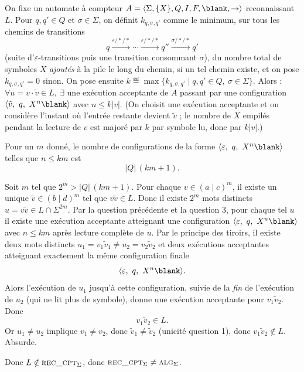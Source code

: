 \begin{corrections}
\begin{questions}
  \item On fixe un automate à compteur $A=\langle \Sigma,\{X\},Q,I,F,\blank,\rightarrow\rangle$ reconnaissant $L$.
    Pour $q,q'\in Q$ et $\sigma\in\Sigma$, on définit $k_{q,\sigma,q'}$ comme le minimum, sur tous les chemins de transitions
    \[
      q \xrightarrow{\varepsilon/\ast/\ast}\cdots\xrightarrow{\varepsilon/\ast/\ast} q'' \xrightarrow{\sigma/\ast/\ast} q'
    \]
    (suite d'$\varepsilon$-transitions puis une transition consommant $\sigma$), du nombre total de symboles $X$ \emph{ajoutés} à la pile le long du chemin,
    si un tel chemin existe, et on pose $k_{q,\sigma,q'}=0$ sinon.
    On pose ensuite
    $k \eqdef \max\{k_{q,\sigma,q'} \mid q,q'\in Q,\ \sigma\in\Sigma\}$.
    Alors :
    $\forall u=v\cdot \tilde v\in L,\ \exists$ une exécution acceptante de $A$ passant par une configuration
      $\langle \tilde v,\ q,\ X^n\blank\rangle$ avec $n\le k|v|$.
    (On choisit une exécution acceptante et on considère l'instant où l'entrée restante devient $\tilde v$ ; le nombre de $X$ empilés pendant la lecture de $v$
    est majoré par $k$ par symbole lu, donc par $k|v|$.)

  \item Pour un $m$ donné, le nombre de configurations de la forme $\langle \varepsilon,\ q,\ X^n\blank\rangle$ telles que $n\le km$ est
    \[
      |Q|\,(km+1).
    \]

  \item Soit $m$ tel que $2^m > |Q|\,(km+1)$.
    Pour chaque $v\in (a\mid c)^m$, il existe un unique $\tilde v\in (b\mid d)^m$ tel que $v\tilde v\in L$.
    Donc il existe $2^m$ mots distincts $u=v\tilde v\in L\cap \Sigma^{2m}$.
    Par la question précédente et la question 3, pour chaque tel $u$ il existe une exécution acceptante atteignant une configuration
    $\langle \varepsilon,\ q,\ X^n\blank\rangle$ avec $n\le km$ après lecture complète de $u$.
    Par le principe des tiroirs, il existe deux mots distincts $u_1=v_1\tilde v_1\neq u_2=v_2\tilde v_2$ et deux exécutions acceptantes atteignant
    exactement la même configuration finale
    \[
      \langle \varepsilon,\ q,\ X^n\blank\rangle.
    \]
    Alors l'exécution de $u_1$ jusqu'à cette configuration, suivie de la \emph{fin} de l'exécution de $u_2$ (qui ne lit plus de symbole), donne une exécution
    acceptante pour $v_1\tilde v_2$.
    Donc
    \[
      v_1\tilde v_2 \in L.
    \]
    Or $u_1\neq u_2$ implique $v_1\neq v_2$, donc $\tilde v_1\neq \tilde v_2$ (unicité question 1), donc $v_1\tilde v_2\notin L$.
    Absurde.

  \item Donc $L\notin \textsc{rec\_cpt}_\Sigma$, donc $\textsc{rec\_cpt}_\Sigma \neq \textsc{alg}_\Sigma$.

  \end{questions}

\end{corrections}

\endgroup
\endinput
